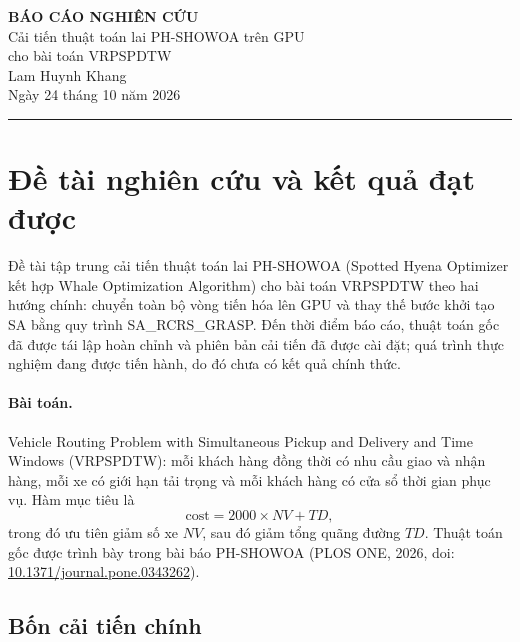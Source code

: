 \documentclass[12pt,a4paper]{article}
\begin{document}
\begin{center}
  {\LARGE\bfseries\color{accent} BÁO CÁO NGHIÊN CỨU}\\[0.5em]
  {\large Cải tiến thuật toán lai PH-SHOWOA trên GPU\\cho bài toán VRPSPDTW}\\[1em]
  {\normalsize Lam Huynh Khang}\\[0.2em]
  {\small Ngày 24 tháng 10 năm 2026}
\end{center}
\vspace{0.5em}
\hrule
\vspace{0.5em}

\section{Đề tài nghiên cứu và kết quả đạt được}

Đề tài tập trung cải tiến thuật toán lai PH-SHOWOA (Spotted Hyena Optimizer kết hợp Whale Optimization Algorithm) cho bài toán VRPSPDTW theo hai hướng chính: chuyển toàn bộ vòng tiến hóa lên GPU và thay thế bước khởi tạo SA bằng quy trình SA\_RCRS\_GRASP. Đến thời điểm báo cáo, thuật toán gốc đã được tái lập hoàn chỉnh và phiên bản cải tiến đã được cài đặt; quá trình thực nghiệm đang được tiến hành, do đó chưa có kết quả chính thức.

\paragraph{Bài toán.} Vehicle Routing Problem with Simultaneous Pickup and Delivery and Time Windows (VRPSPDTW): mỗi khách hàng đồng thời có nhu cầu giao và nhận hàng, mỗi xe có giới hạn tải trọng và mỗi khách hàng có cửa sổ thời gian phục vụ. Hàm mục tiêu là
\[
  \text{cost} = 2000 \times \mathit{NV} + \mathit{TD},
\]
trong đó ưu tiên giảm số xe $\mathit{NV}$, sau đó giảm tổng quãng đường $\mathit{TD}$. Thuật toán gốc được trình bày trong bài báo PH-SHOWOA (PLOS ONE, 2026, doi: \href{https://doi.org/10.1371/journal.pone.0343262}{10.1371/journal.pone.0343262}).

\subsection{Bốn cải tiến chính}
\end{document}

